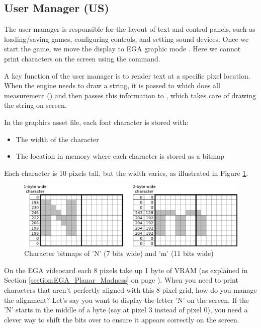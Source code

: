 \documentclass[book.tex]{subfiles}
\begin{document}
 
\subsection{User Manager (US)} 
\label{section:bitshifting}
The user manager is responsible for the layout of text and control panels, such as loading/saving games, configuring controls, and setting sound devices. Once we start the game, we move the display to EGA graphic mode . Here we cannot print characters on the screen using the  command. \\

\par
A key function of the user manager is to render text at a specific pixel location. When the engine needs to draw a string, it is passed to  which does all measurement () and then passes this information to , which takes care of drawing the string on screen.\\

\par
In the graphics asset file, each font character is stored with:
\begin{itemize}
  \item The width of the character
  \item The location in memory where each character is stored as a bitmap
\end{itemize}
Each character is 10 pixels tall, but the width varies, as illustrated in Figure \ref{fig:text_bitmap}. 
\begin{figure}[H]
\centering
 \includegraphics[width=\textwidth]{imgs/drawings/text_bitmap.eps}
 \caption{Character bitmaps of 'N' (7 bits wide) and 'm' (11 bits wide)}
 \label{fig:text_bitmap}
 \end{figure}
 \par
 
On the EGA videocard each 8 pixels take up 1 byte of VRAM (as explained in Section \ref{section:EGA_Planar_Madness} on page \pageref{section:EGA_Planar_Madness}). When you need to print characters that aren't perfectly aligned with this 8-pixel grid, how do you manage the alignment? Let's say you want to display the letter 'N' on the screen. If the 'N' starts in the middle of a byte (say at pixel 3 instead of pixel 0), you need a clever way to shift the bits over to ensure it appears correctly on the screen.\\
\end{document}
